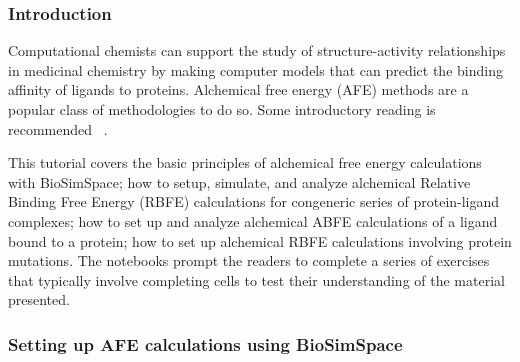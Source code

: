 
\subsubsection{Introduction}


Computational chemists can support the study of structure-activity relationships in medicinal chemistry by making computer models that can predict the binding affinity of ligands to proteins. Alchemical free energy (AFE) methods are a popular class of methodologies to do so. Some
introductory reading is recommended ~\cite{mey2020best, cournia_allen_sherman_2017, kuhn_firth-clark_tosco_mey_mackey_michel_2020, Hahn2022}.

This tutorial covers the basic principles of alchemical free energy calculations with BioSimSpace; how to setup, simulate, and analyze alchemical Relative Binding Free Energy (RBFE) calculations for congeneric series of protein-ligand complexes; how to set up and analyze alchemical ABFE calculations of a ligand bound to a protein; how to set up alchemical RBFE calculations involving protein mutations.  
The notebooks prompt the readers to complete a series of exercises that typically involve completing cells to test their understanding of the material presented. 

\subsubsection{Setting up AFE calculations using BioSimSpace}

